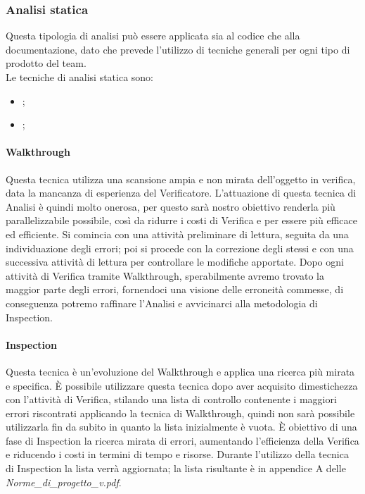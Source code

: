 \subsubsection{Analisi statica}
\label{3.1}
Questa tipologia di analisi può essere applicata sia al codice che alla documentazione, dato che prevede l'utilizzo di tecniche generali per ogni tipo di prodotto del team.\\
Le tecniche di analisi statica sono:
\begin{itemize}
\item {};
\item {};
\end{itemize}

\paragraph{Walkthrough}
Questa tecnica utilizza una scansione ampia e non mirata dell'oggetto in verifica, data la mancanza di esperienza  del Verificatore.
L'attuazione di questa tecnica di Analisi è quindi molto onerosa, per questo sarà nostro obiettivo renderla più parallelizzabile possibile, così da ridurre i costi di Verifica e per essere più efficace ed efficiente.
Si comincia con una attività preliminare di lettura, seguita da una individuazione degli errori; poi si procede con la correzione degli stessi e con una successiva attività di lettura per controllare le modifiche apportate.
Dopo ogni attività di Verifica tramite Walkthrough, sperabilmente avremo trovato la maggior parte degli errori, fornendoci una visione delle erroneità commesse, di conseguenza potremo raffinare l'Analisi e avvicinarci alla metodologia di Inspection.

\paragraph{Inspection}
Questa tecnica è un'evoluzione del Walkthrough e applica una ricerca più mirata e specifica. È possibile utilizzare questa tecnica dopo aver acquisito dimestichezza con l'attività di Verifica, stilando una lista di controllo contenente i maggiori errori riscontrati applicando la tecnica di Walkthrough, quindi non sarà possibile utilizzarla fin da subito in quanto la lista inizialmente è vuota. \`{E} obiettivo di una fase di Inspection la ricerca mirata di errori, aumentando l'efficienza della Verifica e riducendo i costi in termini di tempo e risorse.
Durante l'utilizzo della tecnica di Inspection la lista verrà aggiornata; la lista risultante è in appendice A delle \emph{Norme\_di\_progetto\_v\versioneNormeDiProgetto{}.pdf}.

